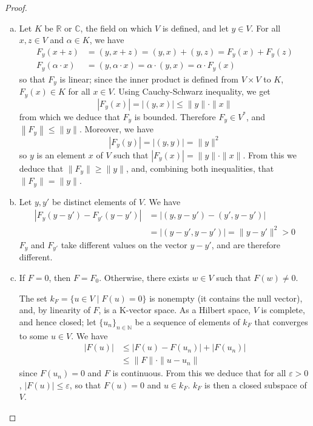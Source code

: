 \documentclass[11pt,a4paper,twoside]{article}
\theoremstyle{definition}
\begin{document}
\begin{proof}\hfill

  \begin{enumerate}[(a)]

  \item Let $K$ be $\mathbb{R}$ or $\mathbb{C}$, the field on which $V$ is defined, and let $y \in V$.
    For all $x, z \in V$ and $\alpha \in K$, we have
    \begin{align*}
      F_y ( x + z ) &= ( y, x + z ) = ( y, x ) + ( y, z ) = F_y ( x ) + F_y ( z ) \\
      F_y ( \alpha \cdot x ) &= ( y, \alpha \cdot x ) = \alpha \cdot ( y, x ) = \alpha \cdot F_y ( x )
    \end{align*}
    so that $F_y$ is linear; since the inner product is defined from $V \times V$ to $K$, $F_y ( x ) \in K$ for all $x \in V$.
    Using Cauchy-Schwarz inequality, we get
    \begin{equation*}
      \left| F_y ( x ) \right| = \left| \left( y, x \right) \right| \leq \| y \| \cdot \| x \|
    \end{equation*}
    from which we deduce that $F_y$ is bounded. Therefore $F_y \in V^*$, and $\left\| F_y \right\| \leq \| y \|$.
    Moreover, we have
    \begin{equation*}
      \left| F_y ( y ) \right| = | ( y, y ) | = \| y \|^2
    \end{equation*}
    so $y$ is an element $x$ of $V$ such that $| F_y ( x ) | = \| y \| \cdot \| x \|$. From this we deduce that
    $\| F_y \| \geq \| y \|$, and, combining both inequalities, that $\| F_y \| = \| y \|$.

  \item Let $y, y'$ be distinct elements of $V$. We have
    \begin{align*}
      | F_y ( y - y' ) - F_{y'} ( y - y' ) | &= | ( y, y - y' ) - ( y', y - y' ) | \\
      &= | ( y - y', y - y' ) | = \| y - y' \|^2 > 0
    \end{align*}
    $F_y$ and $F_{y'}$ take different values on the vector $y - y'$, and are therefore different.

  \item If $F = 0$, then $F = F_0$. Otherwise, there exists $w \in V$ such that $F ( w ) \neq 0$.

    The set $k_F = \{ u \in V \mid F ( u ) = 0 \}$ is nonempty (it contains the null vector), and, by linearity of $F$,
    is a K-vector space. As a Hilbert space, $V$ is complete, and hence closed; let $\{ u_n \}_{n \in \mathbb{N}}$ be
    a sequence of elements of $k_F$ that converges to some $u \in V$. We have
    \begin{align*}
      | F ( u ) | &\leq | F ( u ) - F ( u_n ) | + | F ( u_n ) | \\
      &\leq \| F \| \cdot \| u - u_n \|
    \end{align*}
    since $F ( u_n ) = 0$ and $F$ is continuous. From this we deduce that for all $\varepsilon > 0$,
    $| F ( u ) | \leq \varepsilon$, so that $F ( u ) = 0$ and $u \in k_F$. $k_F$ is then a closed subspace of $V$.


\end{enumerate}
\end{proof}
\end{document}
